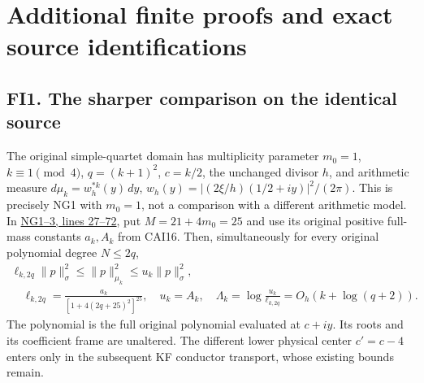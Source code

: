 \documentclass[11pt]{article}
\begin{document}
\section{Additional finite proofs and exact source identifications}\label{additional-finite-proofs-and-exact-source-identifications}

\subsection{FI1. The sharper comparison on the identical source}\label{fi1.-the-sharper-comparison-on-the-identical-source}

The original simple-quartet domain has multiplicity parameter \(m_0=1\), \(k\equiv1\pmod4\), \(q=(k+1)^2\), \(c=k/2\), the unchanged divisor \(h\), and arithmetic measure \(d\mu_k=w_h^{*k}(y)\,dy\), \(w_h(y)=|(2\xi/h)(1/2+iy)|^2/(2\pi)\). This is precisely NG1 with \(m_0=1\), not a comparison with a different arithmetic model. In \href{https://github.com/KokunoYumeto/zeta-function-research-reader/blob/5992ad50c0f2a06921f1fcaded7b4e38097c0739/workbenches/splitzero-tandem/continuations/20260920-original-kernel-mixed-determinants/providers/NATIVE_GAUSSIAN_TRANSFER.tex\#L27}{NG1--3, lines 27--72}, put \(M=21+4m_0=25\) and use its original positive full-mass constants \(a_k,A_k\) from CAI16. Then, simultaneously for every original polynomial degree \(N\le2q\), \[
\begin{gathered}\ell_{k,2q}\|p\|_\sigma^2\le\|p\|_{\mu_k}^2\le u_k\|p\|_\sigma^2,\\
 \quad \ell_{k,2q}=\frac{a_k}{[1+4(2q+25)^2]^{25}},\quad u_k=A_k,
 \quad \Lambda_k=\log\frac{u_k}{\ell_{k,2q}}=O_h(k+\log(q+2)).
\end{gathered}\tag{FI1}
\] The polynomial is the full original polynomial evaluated at \(c+iy\). Its roots and its coefficient frame are unaltered. The different lower physical center \(c'=c-4\) enters only in the subsequent KF conductor transport, whose existing bounds remain.
\end{document}
